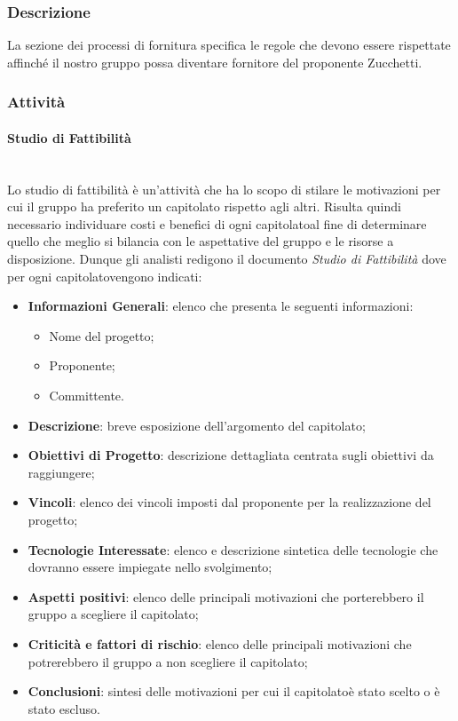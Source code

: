 \subsubsection{Descrizione}
La sezione dei processi di fornitura specifica le regole che devono essere rispettate affinché il nostro gruppo possa diventare fornitore del proponente Zucchetti.
\subsubsection{Attività}
\paragraph{Studio di Fattibilità}\mbox{}\\ [1mm]
Lo studio di fattibilità è un'attività che ha lo scopo di stilare le motivazioni per cui il gruppo ha preferito un capitolato rispetto agli altri.
Risulta quindi necessario individuare costi e benefici di ogni capitolato\glosp al fine di determinare quello che meglio si bilancia con le aspettative del gruppo e le risorse a disposizione.
Dunque gli analisti redigono il documento \textit{Studio di Fattibilità} dove per ogni capitolato\glosp vengono indicati:
\begin{itemize}
	\item \textbf{Informazioni Generali}: elenco che presenta le seguenti informazioni: 
	\begin{itemize}
		\item Nome del progetto;
		\item Proponente;
		\item Committente.
	\end{itemize} 
	\item \textbf{Descrizione}: breve esposizione dell'argomento del capitolato\glo;
	\item \textbf{Obiettivi di Progetto}: descrizione dettagliata centrata sugli obiettivi da raggiungere;
	\item \textbf{Vincoli}: elenco dei vincoli imposti dal proponente per la realizzazione del progetto;
	\item \textbf{Tecnologie Interessate}: elenco e descrizione sintetica delle tecnologie che dovranno essere impiegate nello svolgimento;
	\item \textbf{Aspetti positivi}: elenco delle principali motivazioni che porterebbero il gruppo a scegliere il capitolato\glo;
	\item \textbf{Criticità e fattori di rischio}: elenco delle principali motivazioni che potrerebbero il gruppo a non scegliere il capitolato\glo;
	\item \textbf{Conclusioni}: sintesi delle motivazioni per cui il capitolato\glosp è stato scelto o è stato escluso.
\end{itemize}

